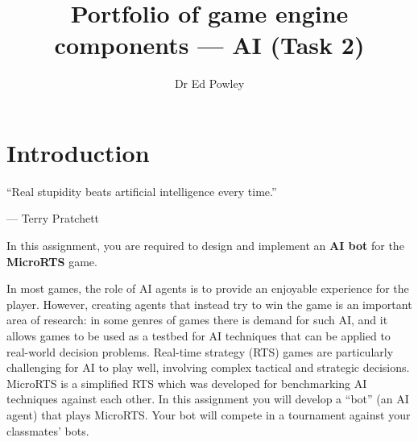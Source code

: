 \documentclass{../../fal_assignment}
\title{Portfolio of game engine components --- AI (Task 2)}
\author{Dr Ed Powley}
\begin{document}
\maketitle

\section*{Introduction}

\begin{marginquote}
``Real stupidity beats artificial intelligence every time.''

--- Terry Pratchett
\end{marginquote}

In this assignment, you are required to design and implement
an \textbf{AI bot} for the \textbf{MicroRTS} game.

In most games, the role of AI agents is to provide an enjoyable experience for the player.
However, creating agents that instead try to win the game is an important area of research:
in some genres of games there is demand for such AI,
and it allows games to be used as a testbed for AI techniques that can be applied to real-world decision problems.
Real-time strategy (RTS) games are particularly challenging for AI to play well,
involving complex tactical and strategic decisions.
MicroRTS is a simplified RTS which was developed for benchmarking AI techniques against each other.
In this assignment you will develop a ``bot'' (an AI agent) that plays MicroRTS.
Your bot will compete in a tournament against your classmates' bots.
\end{document}
